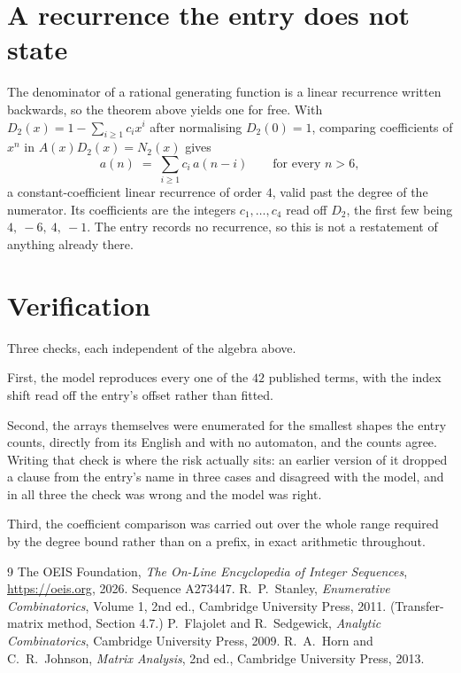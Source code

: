 \documentclass[11pt,a4paper]{article}
\theoremstyle{plain}
\theoremstyle{definition}
\begin{document}
\section{A recurrence the entry does not state}

The denominator of a rational generating function is a linear recurrence written backwards, so
the theorem above yields one for free. With $D_2(x)=1-\sum_{i\ge1}c_ix^i$ after normalising
$D_2(0)=1$, comparing coefficients of $x^n$ in $A(x)D_2(x)=N_2(x)$ gives
\[
a(n)\;=\;\sum_{i\ge1}c_i\,a(n-i)\qquad\text{for every }n>6,
\]
a constant-coefficient linear recurrence of order $4$, valid past the degree of the
numerator. Its coefficients are the integers $c_1,\dots,c_{4}$ read off $D_2$, the first few being $4,\ -6,\ 4,\ -1$. The entry records no recurrence, so this is not a restatement of anything
already there.

\section{Verification}

Three checks, each independent of the algebra above.

First, the model reproduces every one of the $42$ published terms, with the index shift
read off the entry's offset rather than fitted.

Second, the arrays themselves were enumerated for the smallest shapes the entry counts,
directly from its English and with no automaton, and the counts agree. Writing that check is
where the risk actually sits: an earlier version of it dropped a clause from the entry's name
in three cases and disagreed with the model, and in all three the check was wrong and the model
was right.

Third, the coefficient comparison was carried out over the whole range required by the degree
bound rather than on a prefix, in exact arithmetic throughout.

\begin{thebibliography}{9}
 The OEIS Foundation, \emph{The On-Line Encyclopedia of Integer
Sequences}, \url{https://oeis.org}, 2026. Sequence A273447.
 R.~P.~Stanley, \emph{Enumerative Combinatorics}, Volume 1, 2nd ed.,
Cambridge University Press, 2011. (Transfer-matrix method, Section 4.7.)
 P.~Flajolet and R.~Sedgewick, \emph{Analytic Combinatorics}, Cambridge
University Press, 2009.
 R.~A.~Horn and C.~R.~Johnson, \emph{Matrix Analysis}, 2nd ed., Cambridge
University Press, 2013.
\end{thebibliography}
\end{document}
